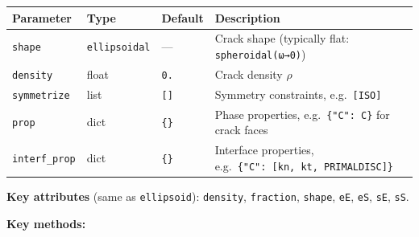 \documentclass[
  a4paper,
  numbers=noendperiod,
  DIV=12]{scrreprt}
\newcounter{none} %
\begin{document}
{\def\LTcaptype{none} %
\begin{longtable}[]{@{}
  >{\raggedright\arraybackslash}p{}
  >{\raggedright\arraybackslash}p{}
  >{\raggedright\arraybackslash}p{}
  >{\raggedright\arraybackslash}p{}@{}}
\toprule\noalign{}
\begin{minipage}[b]{\linewidth}\raggedright
Parameter
\end{minipage} & \begin{minipage}[b]{\linewidth}\raggedright
Type
\end{minipage} & \begin{minipage}[b]{\linewidth}\raggedright
Default
\end{minipage} & \begin{minipage}[b]{\linewidth}\raggedright
Description
\end{minipage} \\
\midrule\noalign{}
\endhead
\bottomrule\noalign{}
\endlastfoot
\texttt{shape} & \texttt{ellipsoidal} & --- & Crack shape (typically
flat: \texttt{spheroidal(ω→0)}) \\
\texttt{density} & float & \texttt{0.} & Crack density \(\rho\) \\
\texttt{symmetrize} & list & \texttt{{[}{]}} & Symmetry constraints,
e.g.~\texttt{{[}ISO{]}} \\
\texttt{prop} & dict & \texttt{\{\}} & Phase properties,
e.g.~\texttt{\{"C":\ C\}} for crack faces \\
\texttt{interf\_prop} & dict & \texttt{\{\}} & Interface properties,
e.g.~\texttt{\{"C":\ {[}kn,\ kt,\ PRIMALDISC{]}\}} \\
\end{longtable}
}

\textbf{Key attributes} (same as \texttt{ellipsoid}): \texttt{density},
\texttt{fraction}, \texttt{shape}, \texttt{eE}, \texttt{eS},
\texttt{sE}, \texttt{sS}.

\textbf{Key methods:}
\end{document}
